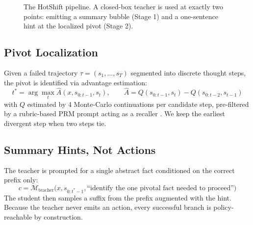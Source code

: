 \documentclass[conference]{IEEEtran}
\begin{document}
\begin{figure}[htbp]
\centering
{}
\caption{The HotShift pipeline. A closed-box teacher is used at exactly two points: emitting a summary bubble (Stage 1) and a one-sentence hint at the localized pivot (Stage 2).}
\label{fig:pipeline}
\end{figure}

\subsection{Pivot Localization}
Given a failed trajectory $\tau = (s_1, \dots, s_T)$ segmented into discrete thought steps, the pivot is identified via advantage estimation:
\begin{equation}
t^* = \arg\max_t \hat{A}(x, s_{0:t-1}, s_t), \qquad \hat{A} = Q(s_{0:t-1}, s_t) - Q(s_{0:t-2}, s_{t-1})
\end{equation}
with $Q$ estimated by 4 Monte-Carlo continuations per candidate step, pre-filtered by a rubric-based PRM prompt acting as a recaller \cite{cso}. We keep the earliest divergent step when two steps tie.

\subsection{Summary Hints, Not Actions}
The teacher is prompted for a single abstract fact conditioned on the correct prefix only:
\begin{equation}
c = \mathcal{M}_{\text{teacher}}\big(x, s_{0:t^*-1}, \text{``identify the one pivotal fact needed to proceed''}\big)
\end{equation}
The student then samples a suffix from the prefix augmented with the hint. Because the teacher never emits an action, every successful branch is policy-reachable by construction.
\end{document}
